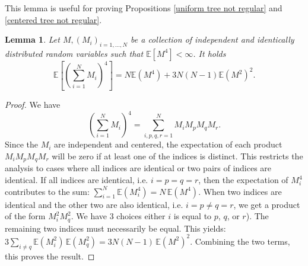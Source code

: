 \documentclass[paper=a4, fontsize=11pt]{scrartcl}
\newtheorem{lemma}[theorem]{Lemma}
\begin{document}

This lemma is useful for proving Propositions \ref{uniform tree not regular} and \ref{centered tree not regular}.
\begin{lemma}\label{lemme moment}
   Let \( M, (M_i)_{i=1,\ldots, N} \) be a collection of independent and identically distributed random variables such that $\mathbb E[M^4] <\infty$. It holds \[\mathbb{E}\left[ \left( \sum_{i=1}^{N} M_i \right)^4\right] = N \mathbb{E}(M^4) + 3N (N-1) \mathbb{E}(M^2)^2. \]
\end{lemma}

\begin{proof}
We have \[   \left( \sum_{i=1}^{N} M_i \right)^4 = \sum_{i,p,q,r=1}^{N} M_i M_p M_q M_r.\]
Since the \( M_i \) are independent and centered, the expectation of each product \( M_i M_p M_q M_r \) will be zero if at least one of the indices is distinct. This restricts the analysis to cases where all indices are identical or two pairs of indices are identical. If all indices are identical, i.e. \( i = p = q = r \), then the expectation of \( M_i^4 \) contributes to the sum: $ \sum_{i=1}^{N} \mathbb{E}(M_i^4) = N \, \mathbb{E}(M^4)$. When two indices are identical and the other two are also identical, i.e. \( i = p \neq q = r \), we get a product of the form \( M_i^2 M_q^2 \). We have 3 choices either $i$ is equal to \( p \), \( q \), or \( r \)). The remaining two indices must necessarily be equal. This yields: $ 3 \sum_{i \neq q} \mathbb{E}(M_i^2) \, \mathbb{E}(M_q^2) = 3N (N - 1) \, \mathbb{E}(M^2)^2.$ Combining the two terms, this proves the result.
\end{proof}


\end{document}
